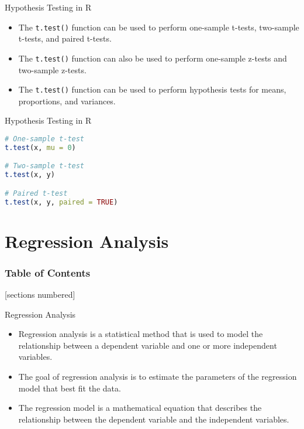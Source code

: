 \documentclass[serif, 9pt, aspectratio=32]{beamer}
\begin{document}
\begin{frame}{Hypothesis Testing in R}
    \begin{itemize}
        \setlength{\itemsep}{2em}
        \item The \texttt{t.test()} function can be used to perform one-sample t-tests, two-sample t-tests, and paired t-tests.
        \item The \texttt{t.test()} function can also be used to perform one-sample z-tests and two-sample z-tests.
        \item The \texttt{t.test()} function can be used to perform hypothesis tests for means, proportions, and variances.
    \end{itemize}
\end{frame}

\begin{frame}[fragile]{Hypothesis Testing in R}
    \begin{lstlisting}[language=R]
# One-sample t-test
t.test(x, mu = 0)

# Two-sample t-test
t.test(x, y)

# Paired t-test
t.test(x, y, paired = TRUE)
    \end{lstlisting}
\end{frame}

\section{Regression Analysis}

\begin{frame}
    \frametitle{Table of Contents}
    [sections numbered]
    \tableofcontents[currentsection]
\end{frame}

\begin{frame}{Regression Analysis}
    \begin{itemize}
        \item Regression analysis is a statistical method that is used to model the relationship between a dependent variable and one or more independent variables.
        \item The goal of regression analysis is to estimate the parameters of the regression model that best fit the data.
        \item The regression model is a mathematical equation that describes the relationship between the dependent variable and the independent variables.
    \end{itemize}
\end{frame}
\end{document}
